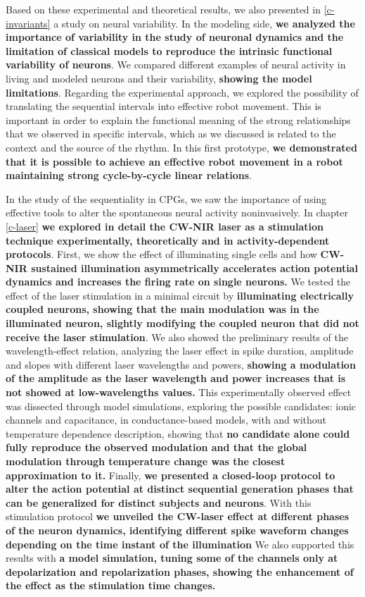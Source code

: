 Based on these experimental and theoretical results, we also presented in \ref{c-invariants} a study on neural variability. In the modeling side, \textbf{we analyzed the importance of variability in the study of neuronal dynamics and the limitation of classical models to reproduce the intrinsic functional variability of neurons}. We compared different examples of neural activity in living and modeled neurons and their variability, \textbf{ showing the model limitations}. Regarding the experimental approach, we explored the possibility of translating the sequential intervals into effective robot movement. This is important in order to explain the functional meaning of the strong relationships that we observed in specific intervals, which as we discussed is related to the context and the source of the rhythm. In this first prototype, \textbf{we demonstrated that it is possible to achieve an effective robot movement in a robot maintaining strong cycle-by-cycle linear relations}.

In the study of the sequentiality in CPGs, we saw the importance of using effective tools to alter the spontaneous neural activity noninvasively. In chapter \ref{c-laser} \textbf{we explored in detail the CW-NIR laser as a stimulation technique experimentally, theoretically and in activity-dependent protocols}. First, we show the effect of illuminating single cells and how \textbf{CW-NIR sustained illumination asymmetrically accelerates action potential dynamics and increases the firing rate on single neurons.} We tested the effect of the laser stimulation in a minimal circuit by \textbf{illuminating electrically coupled neurons, showing that the main modulation was in the illuminated neuron, slightly modifying the coupled neuron that did not receive the laser stimulation}. We also showed the preliminary results of the wavelength-effect relation, analyzing the laser effect in spike duration, amplitude and slopes with different laser wavelengths and powers, \textbf{showing a modulation of the amplitude as the laser wavelength and power increases that is not showed at low-wavelengths values.} This experimentally observed effect was dissected through model simulations, exploring the possible candidates: ionic channels and capacitance, in conductance-based models, with and without temperature dependence description, showing that \textbf{no candidate alone could fully reproduce the observed modulation and that the global modulation through temperature change was the closest approximation to it.} Finally, \textbf{we presented a closed-loop protocol to alter the action potential at distinct sequential generation phases that can be generalized for distinct subjects and neurons}. With this stimulation protocol \textbf{we unveiled the CW-laser effect at different phases of the neuron dynamics,  identifying different spike waveform changes depending on the time instant of the illumination} We also supported this results with \textbf{a model simulation, tuning some of the channels only at depolarization and repolarization phases, showing the enhancement of the effect as the stimulation time changes.}

